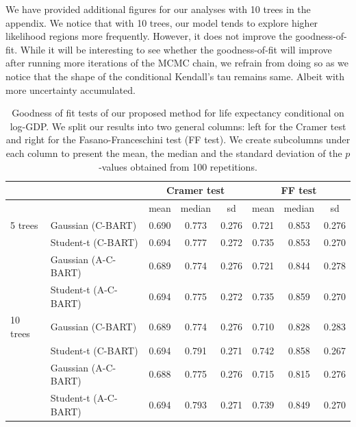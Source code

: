 \documentclass[
12pt]{article}
\begin{document}
	We have provided additional figures for our analyses with 10 trees in the appendix. We notice that with 10 trees, our model tends to explore higher likelihood regions more frequently. However, it does not improve the goodness-of-fit. While it will be interesting to see whether the goodness-of-fit will improve after running more iterations of the MCMC chain, we refrain from doing so as we notice that the shape of the conditional Kendall's tau remains same. Albeit with more uncertainty accumulated.
	\begin{table}[h]
		\centering
		\begin{tabular}{l|l|ccc|ccc}
			\multicolumn{2}{c|}{} &
			\multicolumn{3}{c|}{Cramer test} &
			\multicolumn{3}{c}{FF test} \\
			\hline
			& & mean & median & sd & mean & median & sd \\ 
			\hline
			5 trees & Gaussian (C-BART) & 0.690 & 0.773 & 0.276 & 0.721 & 0.853 & 0.276 \\ 
			& Student-t (C-BART) & 0.694 & 0.777 & 0.272 & 0.735 & 0.853 & 0.270 \\ 
			& Gaussian (A-C-BART) & 0.689 & 0.774 & 0.276 & 0.721 & 0.844 & 0.278 \\ 
			& Student-t (A-C-BART) & 0.694 & 0.775 & 0.272 & 0.735 & 0.859 & 0.270 \\ 
			\hline
			10 trees & Gaussian (C-BART) & 0.689 & 0.774 & 0.276 & 0.710 & 0.828 & 0.283 \\ 
			& Student-t (C-BART) & 0.694 & 0.791 & 0.271 & 0.742 & 0.858 & 0.267 \\ 
			& Gaussian (A-C-BART) & 0.688 & 0.775 & 0.276 & 0.715 & 0.815 & 0.276 \\ 
			& Student-t (A-C-BART) & 0.694 & 0.793 & 0.271 & 0.739 & 0.849 & 0.270 \\ 
		\end{tabular}
		\caption{Goodness of fit tests of our proposed method for life expectancy conditional on log-GDP. We split our results into two general columns: left for the Cramer test and right for the Fasano-Franceschini test (FF test). We create subcolumns under each column to present the mean, the median and the standard deviation of the $p$-values obtained from 100 repetitions.}
		\label{tab:LE:p-val}
	\end{table}
	
\end{document}
